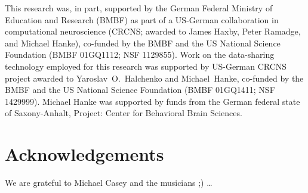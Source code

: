 This research was, in part, supported by the German Federal Ministry of
Education and Research (BMBF) as part of a US-German collaboration in
computational neuroscience (CRCNS; awarded to James Haxby, Peter Ramadge, and
Michael Hanke), co-funded by the BMBF and the US National Science Foundation
(BMBF 01GQ1112; NSF 1129855).  Work on the data-sharing technology employed for
this research was supported by US-German CRCNS project awarded to
Yaroslav~O.~Halchenko and Michael~Hanke, co-funded by the BMBF and the US
National Science Foundation (BMBF 01GQ1411; NSF 1429999).  Michael Hanke was
supported by funds from the German federal state of Saxony-Anhalt, Project:
Center for Behavioral Brain Sciences.


\section*{Acknowledgements}

We are grateful to Michael Casey and the musicians ;) \ldots
{}





